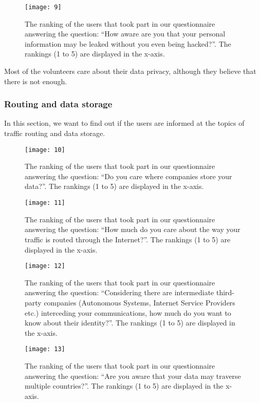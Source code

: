 \begin{figure}[hp]
\centering
\texttt{[image: 9]}
\caption{The ranking of the users that took part in our questionnaire answering
the question: ``How aware are you that your personal information may be leaked 
without you even being hacked?''. The rankings (1 to 5) are displayed in the 
x-axis.}
\end{figure}

Most of the volunteers care about their data privacy, although they believe that 
there is not enough.

\subsubsection{Routing and data storage}

In this section, we want to find out if the users are informed at the topics of 
traffic routing and  data storage.

\begin{figure}[hp]
\centering
\texttt{[image: 10]}
\caption{The ranking of the users that took part in our questionnaire answering
the question: ``Do you care where companies store your data?''. The rankings (1 
to 5) are displayed in the x-axis.}
\end{figure}

\begin{figure}[hp]
\centering
\texttt{[image: 11]}
\caption{The ranking of the users that took part in our questionnaire answering
the question: ``How much do you care about the way your traffic is routed 
through the Internet?''. The rankings (1 to 5) are displayed in the x-axis.}
\end{figure}

\begin{figure}[hp]
\centering
\texttt{[image: 12]}
\caption{The ranking of the users that took part in our questionnaire answering
the question: ``Considering there are intermediate third-party companies 
(Autonomous Systems, Internet Service Providers etc.) interceding your 
communications, how much do you want to know about their identity?''. The 
rankings (1 to 5) are displayed in the x-axis.}
\end{figure}

\begin{figure}[hp]
\centering
\texttt{[image: 13]}
\caption{The ranking of the users that took part in our questionnaire answering
the question: ``Are you aware that your data may traverse multiple countries?''. The
rankings (1 to 5) are displayed in the x-axis.}
\end{figure}

